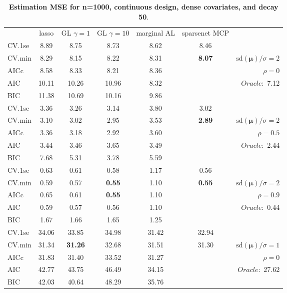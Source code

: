 \begin{table}\vspace{-.5cm}
\caption[l]{ { \bf Estimation MSE for n=1000, continuous design, 
dense covariates, and  decay  50}.}
\vspace{-.5cm}
\footnotesize{}
\begin{center}
\begin{tabular}{l*{5}{c}|r}
& lasso & GL $\gamma=1$ & GL $\gamma=10$ & marginal AL & sparsenet MCP  & \\
 \cline{1-7}
CV.1se & 8.89 & 8.75 & 8.73 & 8.62 & 8.46 & \\
CV.min & 8.29 & 8.15 & 8.22 & 8.31 & {\bf 8.07} &  $\mathrm{sd}(\mathbf{\mu})/\sigma=2$ \\
AICc & 8.58 & 8.33 & 8.21 & 8.36 & & $\rho=0$ \\
AIC & 10.11 & 10.26 & 10.96 & 8.32 & &  \multirow{2}{*}{$Oracle: $ 7.12} \\
BIC & 11.38 & 10.69 & 10.16 & 9.86 & &  \\
 \hline 
CV.1se & 3.36 & 3.26 & 3.14 & 3.80 & 3.02 & \\
CV.min & 3.10 & 3.02 & 2.95 & 3.53 & {\bf 2.89} &  $\mathrm{sd}(\mathbf{\mu})/\sigma=2$ \\
AICc & 3.36 & 3.18 & 2.92 & 3.60 & & $\rho=0.5$ \\
AIC & 3.44 & 3.46 & 3.65 & 3.49 & &  \multirow{2}{*}{$Oracle: $ 2.44} \\
BIC & 7.68 & 5.31 & 3.78 & 5.59 & &  \\
 \hline 
CV.1se & 0.63 & 0.61 & 0.58 & 1.17 & 0.56 & \\
CV.min & 0.59 & 0.57 & {\bf 0.55} & 1.10 & {\bf 0.55} &  $\mathrm{sd}(\mathbf{\mu})/\sigma=2$ \\
AICc & 0.65 & 0.61 & {\bf 0.55} & 1.10 & & $\rho=0.9$ \\
AIC & 0.59 & 0.57 & 0.56 & 1.10 & &  \multirow{2}{*}{$Oracle: $ 0.44} \\
BIC & 1.67 & 1.66 & 1.65 & 1.25 & &  \\
 \hline 
CV.1se & 34.06 & 33.85 & 34.98 & 31.42 & 32.94 & \\
CV.min & 31.34 & {\bf 31.26} & 32.68 & 31.51 & 31.30 &  $\mathrm{sd}(\mathbf{\mu})/\sigma=1$ \\
AICc & 31.83 & 31.40 & 33.52 & 31.27 & & $\rho=0$ \\
AIC & 42.77 & 43.75 & 46.49 & 34.15 & &  \multirow{2}{*}{$Oracle: $ 27.62} \\
BIC & 42.03 & 40.64 & 48.29 & 35.76 & &  \\

\end{tabular}
\end{center}
\end{table}
